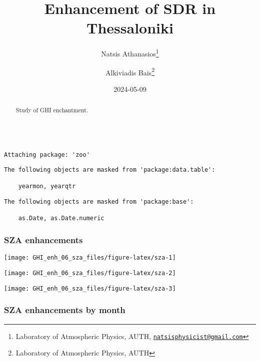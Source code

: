 \documentclass[
  10pt,
  a4paper,oneside]{article}
\title{Enhancement of SDR in Thessaloniki}
\author{Natsis Athanasios\footnote{Laboratory of Atmospheric Physics, AUTH, \href{mailto:natsisphysicist@gmail.com}{\nolinkurl{natsisphysicist@gmail.com}}} \and Alkiviadis Bais\footnote{Laboratory of Atmospheric Physics, AUTH}}
\date{2024-05-09}
\begin{document}
\maketitle
\begin{abstract}
Study of GHI enchantment.
\end{abstract}

{
\hypersetup{linkcolor=}
\setcounter{tocdepth}{4}
\tableofcontents
}
\begin{verbatim}

Attaching package: 'zoo'
\end{verbatim}

\begin{verbatim}
The following objects are masked from 'package:data.table':

    yearmon, yearqtr
\end{verbatim}

\begin{verbatim}
The following objects are masked from 'package:base':

    as.Date, as.Date.numeric
\end{verbatim}

\newpage
\FloatBarrier

\hypertarget{sza-enhancements}{%
\subsubsection{SZA enhancements}\label{sza-enhancements}}

\begin{center}\texttt{[image: GHI\_enh\_06\_sza\_files/figure-latex/sza-1]} \end{center}

\begin{center}\texttt{[image: GHI\_enh\_06\_sza\_files/figure-latex/sza-2]} \end{center}

\begin{center}\texttt{[image: GHI\_enh\_06\_sza\_files/figure-latex/sza-3]} \end{center}

\newpage
\FloatBarrier

\hypertarget{sza-enhancements-by-month}{%
\subsubsection{SZA enhancements by month}\label{sza-enhancements-by-month}}
\end{document}
